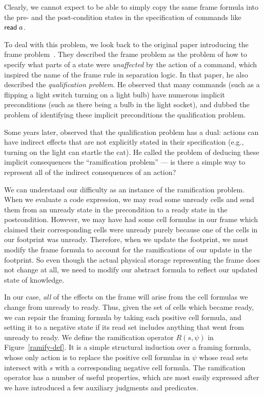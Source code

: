 \documentclass[natbib]{sigplanconf}
\begin{document}
Clearly, we cannot expect to be able to simply copy the same frame
formula into the pre- and the post-condition states in the
specification of commands like $\mbox{\textsf{{read}}}\; a$.

To deal with this problem, we look back to the original paper
introducing the frame problem~\cite{mccarthy}. They described the
frame problem as the problem of how to specify what parts of a state
were \emph{unaffected} by the action of a command, which inspired the
name of the frame rule in separation logic. In that paper, he also
described the \emph{qualification problem}. He observed that many
commands (such as a flipping a light switch turning on a light bulb)
have numerous implicit preconditions (such as there being a bulb in
the light socket), and dubbed the problem of identifying these
implicit preconditions the qualification problem.

Some years later, \citet{finger} observed that the qualification
problem has a dual: actions can have indirect effects that are not
explicitly stated in their specification (e.g., turning on the light can
startle the cat). He called the problem of deducing these implicit
consequences the ``ramification problem'' --- is there a simple way to
represent all of the indirect consequences of an action?

We can understand our difficulty as an instance of the ramification
problem. When we evaluate a code expression, we may read some unready
cells and send them from an unready state in the precondition to a ready
state in the postcondition. However, we may have had some cell formulas in
our frame which claimed their corresponding cells were unready purely
because one of the cells in our footprint was unready. Therefore, when
we update the footprint, we must modify the frame formula to account
for the ramifications of our update in the footprint. So even though
the actual physical storage representing the frame does not change at all, 
we need to modify our abstract formula to reflect our updated state
of knowledge. 

In our case, \emph{all} of the effects on the frame will arise from
the cell formulas we change from unready to ready. Thus, given the set of cells
which became ready, we can repair the framing formula by taking each
positive cell formula, and setting it to a negative state if its read
set includes anything that went from unready to ready. We define the
ramification operator $R(s, \psi)$ in Figure~\ref{ramify-def}.  It is
a simple structural induction over a framing formula, whose only
action is to replace the positive cell formulas in $\psi$ whose read
sets intersect with $s$ with a corresponding negative cell formula.
The ramification operator has a number of useful properties, which are
most easily expressed after we have introduced a few auxiliary
judgments and predicates.
\end{document}
